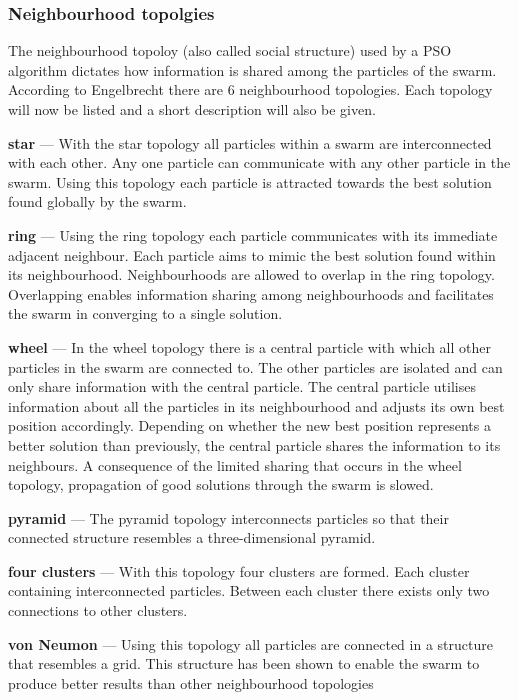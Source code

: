 \subsubsection{Neighbourhood topolgies}
The neighbourhood topoloy (also called social structure) used by a \gls{PSO} algorithm dictates how information is shared among the particles of the swarm. According to Engelbrecht\cite{FundamentalSwarm} there are 6 neighbourhood topologies. Each topology will now be listed and a short description will also be given.
\begin{description}
\item{\textbf{star}} --- With the star topology all particles within a swarm are interconnected with each other. Any one particle can communicate with any other particle in the swarm\cite{FundamentalSwarm}. Using this topology each particle is attracted towards the best solution found globally by the swarm\cite{FundamentalSwarm}. 
\item{\textbf{ring}} --- Using the ring topology each particle communicates with its immediate adjacent neighbour\cite{FundamentalSwarm}. Each particle aims to mimic the best solution found within its neighbourhood\cite{FundamentalSwarm}. Neighbourhoods are allowed to overlap in the ring topology\cite{FundamentalSwarm}. Overlapping enables information sharing among neighbourhoods and facilitates the swarm in converging to a single solution\cite{FundamentalSwarm}. 
\item{\textbf{wheel}} --- In the wheel topology there is a central particle with which all other particles in the swarm are connected to\cite{FundamentalSwarm}. The other particles are isolated and can only share information with the central particle\cite{FundamentalSwarm}. The central particle utilises information about all the particles in its neighbourhood and adjusts its own best position accordingly\cite{FundamentalSwarm}. Depending on whether the new best position represents a better solution than previously, the central particle shares the information to its neighbours\cite{FundamentalSwarm}. A consequence of the limited sharing that occurs in the wheel topology, propagation of good solutions through the swarm is slowed\cite{FundamentalSwarm}.
\item{\textbf{pyramid}} --- The pyramid topology interconnects particles so that their connected structure resembles a three-dimensional pyrami\cite{FundamentalSwarm}d.
\item{\textbf{four clusters}} --- With this topology four clusters are formed. Each cluster containing interconnected particles\cite{FundamentalSwarm}. Between each cluster there exists only two connections to other clusters\cite{FundamentalSwarm}.
\item{\textbf{von Neumon}} --- Using this topology all particles are connected in a structure that resembles a grid\cite{FundamentalSwarm}. This structure has been shown to enable the swarm to produce better results than other neighbourhood topologies\cite{FundamentalSwarm}
\end{description}

